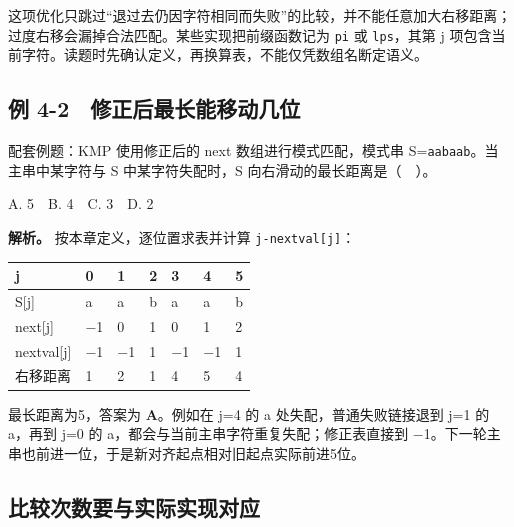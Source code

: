 这项优化只跳过``退过去仍因字符相同而失败''的比较，并不能任意加大右移距离；过度右移会漏掉合法匹配。某些实现把前缀函数记为 \texttt{pi} 或 \texttt{lps}，其第 j 项包含当前字符。读题时先确认定义，再换算表，不能仅凭数组名断定语义。

\subsection{例 4-2　修正后最长能移动几位}\label{DS04-ex2}

\begin{example}[配套例题]

配套例题：KMP 使用修正后的 next 数组进行模式匹配，模式串 S=\texttt{aabaab}。当主串中某字符与 S 中某字符失配时，S 向右滑动的最长距离是（　）。

A. 5　B. 4　C. 3　D. 2

\end{example}

\textbf{解析。} 按本章定义，逐位置求表并计算 \texttt{j-nextval[j]}：

\begin{wideblock}\par\medskip\noindent\begin{minipage}{\linewidth}\fontsize{9.3}{12}\selectfont\begin{tabularx}{\linewidth}{@{}YYYYYYY@{}}
\toprule\noalign{}
j & 0 & 1 & 2 & 3 & 4 & 5 \\
\midrule\noalign{}


S{[}j{]} & a & a & b & a & a & b \\
next{[}j{]} & \ensuremath{-}1 & 0 & 1 & 0 & 1 & 2 \\
nextval{[}j{]} & \ensuremath{-}1 & \ensuremath{-}1 & 1 & \ensuremath{-}1 & \ensuremath{-}1 & 1 \\
右移距离 & 1 & 2 & 1 & 4 & 5 & 4 \\
\bottomrule\end{tabularx}
\end{minipage}\par\medskip\end{wideblock}

最长距离为5，答案为 \textbf{A}。例如在 j=4 的 a 处失配，普通失败链接退到 j=1 的 a，再到 j=0 的 a，都会与当前主串字符重复失配；修正表直接到 \ensuremath{-}1。下一轮主串也前进一位，于是新对齐起点相对旧起点实际前进5位。

\subsection{比较次数要与实际实现对应}\label{DS04-detail3}

